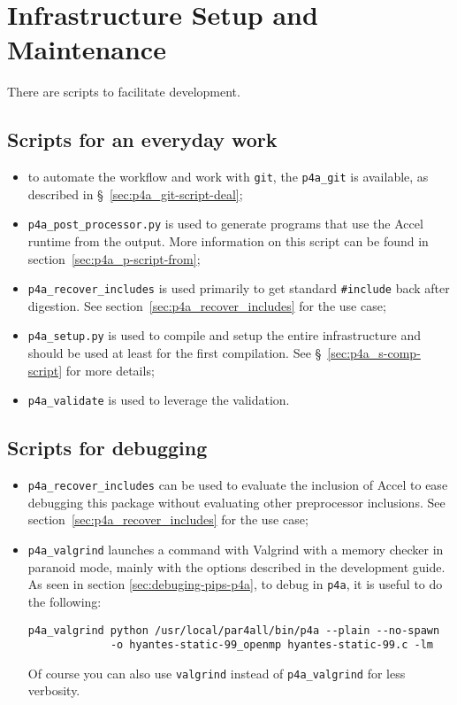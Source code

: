 \documentclass[a4paper]{article}
\begin{document}
\section{Infrastructure Setup and Maintenance}
\label{sec:setup}

There are scripts to facilitate development.


\subsection{Scripts for an everyday work}
\label{sec:an-everyday-work}

\begin{itemize}
\item to automate the \Apfa workflow and work with \texttt{git}, the
  \verb|p4a_git| is available, as described in
  \S~\ref{sec:p4a_git-script-deal};
\item \verb|p4a_post_processor.py| is used to generate programs that use
  the \Apfa Accel runtime from the \Apips output. More information on
  this script can be found in section~\ref{sec:p4a_p-script-from};
\item \verb|p4a_recover_includes| is used primarily to get standard
  \verb|#include| back after \Apips digestion. See
  section~\ref{sec:p4a_recover_includes} for the use case;
\item \verb|p4a_setup.py| is used to compile and setup the entire \Apfa
  infrastructure and should be used at least for the first
  compilation. See \S~\ref{sec:p4a_s-comp-script} for more details;
\item \verb|p4a_validate| is used to leverage the \Apips validation.
\end{itemize}


\subsection{Scripts for debugging}
\label{sec:scripts-debugging}

\begin{itemize}
\item \verb|p4a_recover_includes| can be used to evaluate the inclusion of
  \Apfa Accel to ease debugging this package without evaluating other
  preprocessor inclusions. See section~\ref{sec:p4a_recover_includes} for
  the use case;
\item \verb|p4a_valgrind| launches a command with Valgrind with a memory
  checker in paranoid mode, mainly with the options described in the
  \Apips development guide. As seen in section
  \ref{sec:debuging-pips-p4a}, to debug \Apips in \texttt{p4a}, it is
  useful to do the following:
\begin{verbatim}
p4a_valgrind python /usr/local/par4all/bin/p4a --plain --no-spawn
             -o hyantes-static-99_openmp hyantes-static-99.c -lm
\end{verbatim}
  Of course you can also use \texttt{valgrind} instead of
  \verb/p4a_valgrind/ for less verbosity.
\end{itemize}
\end{document}

